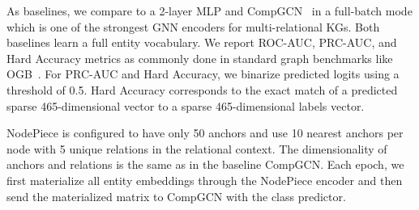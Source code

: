 \documentclass{article} \usepackage{iclr2022_conference,times}
\begin{document}
As baselines, we compare to a 2-layer MLP and CompGCN~\citep{Vashishth2020Composition-based} in a full-batch mode which is one of the strongest GNN encoders for multi-relational KGs. 
Both baselines learn a full entity vocabulary. 
We report ROC-AUC, PRC-AUC, and Hard Accuracy metrics as commonly done in standard graph benchmarks like OGB~\citep{DBLP:conf/nips/HuFZDRLCL20}. 
For PRC-AUC and Hard Accuracy, we binarize predicted logits using a threshold of 0.5. 
Hard Accuracy corresponds to the exact match of a predicted sparse 465-dimensional vector to a sparse 465-dimensional labels vector.

NodePiece is configured to have only 50 anchors and use 10 nearest anchors per node with 5 unique relations in the relational context. 
The dimensionality of anchors and relations is the same as in the baseline CompGCN.
Each epoch, we first materialize all entity embeddings through the NodePiece encoder and then send the materialized matrix to CompGCN with the class predictor.

\begin{table}[t]
\centering
\caption{Node classification results.  denotes vocabulary size (anchors + relations), \#P is a total parameter count (millions).}
\label{tab:nc1}
\end{table}
\end{document}
